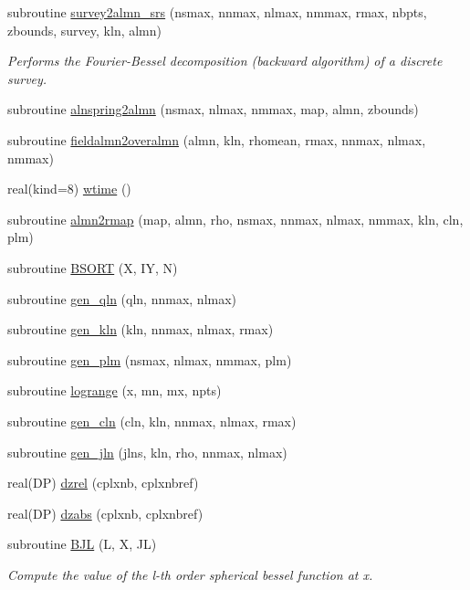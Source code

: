 \begin{DoxyCompactItemize}
\item 
subroutine \hyperlink{namespacef3dex_a177ac0f41749e15dd33c7a4477d13a0e}{survey2almn\_\-srs} (nsmax, nnmax, nlmax, nmmax, rmax, nbpts, zbounds, survey, kln, almn)
\begin{DoxyCompactList}\small\item\em Performs the Fourier-\/Bessel decomposition (backward algorithm) of a discrete survey. \end{DoxyCompactList}\item 
subroutine \hyperlink{namespacef3dex_ae28575da877299326cf5d412b7bda063}{alnspring2almn} (nsmax, nlmax, nmmax, map, almn, zbounds)
\item 
subroutine \hyperlink{namespacef3dex_a902c376a4e5d7c84a39d6274dc904602}{fieldalmn2overalmn} (almn, kln, rhomean, rmax, nnmax, nlmax, nmmax)
\item 
real(kind=8) \hyperlink{namespacef3dex_ac014e878f644407cfc3eb1af25137d44}{wtime} ()
\item 
subroutine \hyperlink{namespacef3dex_ae2e71647b18208d49ce5ebc6dcc3dbea}{almn2rmap} (map, almn, rho, nsmax, nnmax, nlmax, nmmax, kln, cln, plm)
\item 
subroutine \hyperlink{namespacef3dex_ac32aa4a30199fa62b6212bea55f59ff5}{BSORT} (X, IY, N)
\item 
subroutine \hyperlink{namespacef3dex_ac7199c2a98971bf758240066422f4a5e}{gen\_\-qln} (qln, nnmax, nlmax)
\item 
subroutine \hyperlink{namespacef3dex_a7aceee3f16c8792cfe12b2d7a53d7acc}{gen\_\-kln} (kln, nnmax, nlmax, rmax)
\item 
subroutine \hyperlink{namespacef3dex_a8ff17a3652c0f3145393cc45fe0a2a6b}{gen\_\-plm} (nsmax, nlmax, nmmax, plm)
\item 
subroutine \hyperlink{namespacef3dex_a6a90245c19e73ec2ce1f8fc42e4ab909}{logrange} (x, mn, mx, npts)
\item 
subroutine \hyperlink{namespacef3dex_adcf1cf51ac34f733e7a776a7df065524}{gen\_\-cln} (cln, kln, nnmax, nlmax, rmax)
\item 
subroutine \hyperlink{namespacef3dex_ad15a4c29088690f9ee5b97799abfc4a5}{gen\_\-jln} (jlns, kln, rho, nnmax, nlmax)
\item 
real(DP) \hyperlink{namespacef3dex_aaab16fb8c4e26a33aa182fcad7916a59}{dzrel} (cplxnb, cplxnbref)
\item 
real(DP) \hyperlink{namespacef3dex_aae21ba3275637af7c40a0f4810f890b8}{dzabs} (cplxnb, cplxnbref)
\item 
subroutine \hyperlink{namespacef3dex_ae7f16ddea56702ffd83912c6def516d4}{BJL} (L, X, JL)
\begin{DoxyCompactList}\small\item\em Compute the value of the l-\/th order spherical bessel function at x. \end{DoxyCompactList}\end{DoxyCompactItemize}
